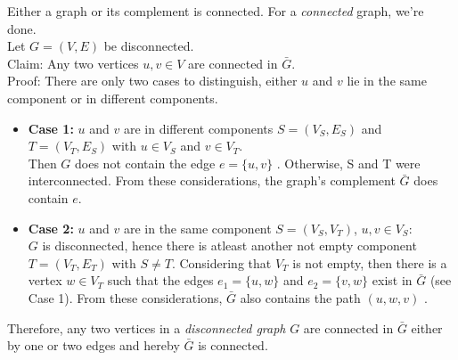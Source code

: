 \documentclass[a4paper]{article}
\begin{document}
	\begin{solution}{3}
		\begin{theorem}{Either a graph or its complement is connected.}
			For a \emph{connected} graph, we're done.\\
			Let $G = (V, E)$ be disconnected. \\
			Claim: Any two vertices $u,v \in V$ are connected in $\bar{G}$. \\
			Proof: There are only two cases to distinguish, either $u$ and $v$ lie in the same component or in different components. 

			\begin{itemize}
				\item  \textbf{Case 1: } $u$ and $v$ are in different components $S = (V_S, E_S)$ and $T = (V_T, E_S)$ with $u \in V_S$ and $v \in V_T$.\\
				Then $G$ does not contain the edge $e = \{u, v\}$ . Otherwise, S and T were interconnected. From these considerations, the graph's complement $\bar{G}$ does contain $e$.
				\begin{center}
				\end{center}

				\item \textbf{Case 2: } $u$ and $v$ are in the same component $S = (V_S, V_T)$, $u, v \in V_S$:\\
					$G$ is disconnected, hence there is atleast another not empty component $T = (V_T, E_T)$ with $S \neq T$. 
					Considering that $V_T$ is not empty, then there is a vertex $w \in V_T$ such that the edges $e_1 = \{u, w\}$ and $e_2 = \{v, w\}$ exist in $\bar{G}$ (see Case 1). From these considerations, $\bar{G}$ also contains the path $(u, w, v)$ .
				\begin{center}
				\end{center}
			\end{itemize}

			Therefore, any two vertices in a \emph{disconnected graph} $G$ are connected in $\bar{G}$ either by one or two edges and hereby $\bar{G}$ is connected.\\
		\end{theorem}
	\end{solution} 
\end{document}
